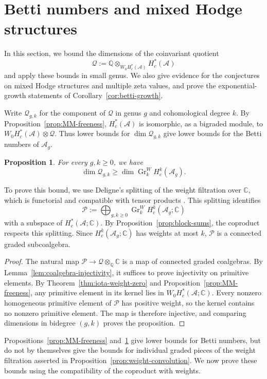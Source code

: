 \documentclass[12 pt]{amsart}
\newcommand{\CC}{\mathbb{C}}
\newcommand{\QQ}{\mathbb{Q}}
\newcommand{\cA}{\mathcal{A}}
\newcommand{\cP}{\mathcal{P}}
\newcommand{\cQ}{\mathcal{Q}}
\newcommand{\Gr}{\operatorname{Gr}}
\newcommand{\<}{\langle}
\renewcommand{\>}{\rangle}
\newtheorem{proposition}[theorem]{Proposition}
\theoremstyle{definition}
\begin{document}
\section{Betti numbers and mixed Hodge structures}\label{sec:betti-bounds}


In this section, we bound the dimensions of the coinvariant quotient
\[
\cQ := \QQ \otimes_{W_0 H_c^*(\cA)} H_c^*(\cA)
\]
and apply these bounds in small genus. We also give evidence for the conjectures on mixed Hodge structures and multiple zeta values, and prove the exponential-growth statements of Corollary~\ref{cor:betti-growth}.

Write $\cQ_{g, k}$ for the component of $\cQ$ in genus $g$ and cohomological degree $k$. By Proposition~\ref{prop:MM-freeness}, $H_c^*(\cA)$ is isomorphic, as a bigraded module, to $W_0 H_c^*(\cA) \otimes \cQ$. Thus lower bounds for $\dim \cQ_{g, k}$ give lower bounds for the Betti numbers of $\cA_g$.

\begin{proposition}\label{prop:coinvariant-top-weight}
For every $g, k \geq 0$, we have
\[
\dim \cQ_{g, k} \geq \dim \Gr_k^W H_c^k(\cA_g).
\]
\end{proposition}

To prove this bound, we use Deligne's splitting of the weight filtration over $\CC$, which is functorial and compatible with tensor products \cite[Proposition~1.9]{Morgan}. This splitting identifies
\[
\cP := \bigoplus_{g, k \geq 0} \Gr_k^W H_c^k(\cA_g; \CC)
\]
with a subspace of $H_c^*(\cA; \CC)$. By Proposition~\ref{prop:block-sums}, the coproduct respects this splitting. Since $H_c^k(\cA_g; \CC)$ has weights at most $k$, $\cP$ is a connected graded subcoalgebra.

\begin{proof}
The natural map $\cP \to \cQ \otimes_{\QQ} \CC$ is a map of connected graded coalgebras. By Lemma~\ref{lem:coalgebra-injectivity}, it suffices to prove injectivity on primitive elements. By Theorem~\ref{thm:iota-weight-zero} and Proposition~\ref{prop:MM-freeness}, any primitive element in its kernel lies in $W_0 H_c^*(\cA; \CC)$. Every nonzero homogeneous primitive element of $\cP$ has positive weight, so the kernel contains no nonzero primitive element. The map is therefore injective, and comparing dimensions in bidegree $(g, k)$ proves the proposition.
\end{proof}

Propositions~\ref{prop:MM-freeness} and~\ref{prop:coinvariant-top-weight} give lower bounds for Betti numbers, but do not by themselves give the bounds for individual graded pieces of the weight filtration asserted in Proposition~\ref{prop:weight-convolution}. We now prove these bounds using the compatibility of the coproduct with weights.
\end{document}
